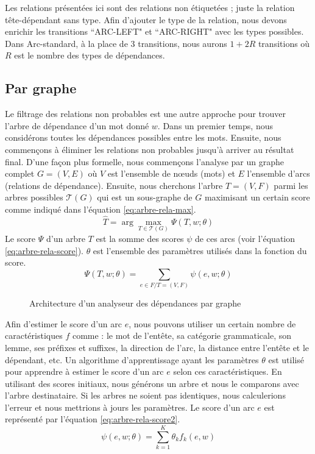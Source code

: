 \documentclass{KodeBook}
\begin{document}
Les relations présentées ici sont des relations non étiquetées ; juste la relation tête-dépendant sans type.
Afin d'ajouter le type de la relation, nous devons enrichir les transitions ``ARC-LEFT" et ``ARC-RIGHT" avec les types possibles. 
Dans Arc-standard, à la place de 3 transitions, nous aurons $1+2R$ transitions où $R$ est le nombre des types de dépendances.

\subsection{Par graphe}

Le filtrage des relations non probables est une autre approche pour trouver l'arbre de dépendance d'un mot donné $w$. 
Dans un premier temps, nous considérons toutes les dépendances possibles entre les mots. 
Ensuite, nous commençons à éliminer les relations non probables jusqu'à arriver au résultat final. 
D'une façon plus formelle, nous commençons l'analyse par un graphe complet $G = (V, E)$ où $V$ est l'ensemble de nœuds (mots) et $E$ l'ensemble d'arcs (relations de dépendance). 
Ensuite, nous cherchons l'arbre $T = (V, F)$ parmi les arbres possibles $\mathcal{T}(G)$ qui est un sous-graphe de $G$ maximisant un certain score comme indiqué dans l'équation \ref{eq:arbre-rela-max}.
\begin{equation}
\hat{T} = \arg\max\limits_{T \in \mathcal{T}(G)} \Psi(T, w; \theta)
\label{eq:arbre-rela-max}
\end{equation}
Le score $\Psi$ d'un arbre $T$ est la somme des scores $\psi$ de ces arcs (voir l'équation \ref{eq:arbre-rela-score}). 
$\theta$ est l'ensemble des paramètres utilisés dans la fonction du score.
\begin{equation}
\Psi(T, w; \theta) = \sum_{e \in F / T = (V, F)} \psi(e, w; \theta)
\label{eq:arbre-rela-score}
\end{equation}

\begin{figure}[ht]
	\centering
	\caption{Architecture d'un analyseur des dépendances par graphe \label{fig:dep-graph-arch}}
\end{figure}

Afin d'estimer le score d'un arc $e$, nous pouvons utiliser un certain nombre de caractéristiques $f$ comme : le mot de l'entête, sa catégorie grammaticale, son lemme, ses préfixes et suffixes, la direction de l'arc, la distance entre l'entête et le dépendant, etc.
Un algorithme d'apprentissage ayant les paramètres $\theta$ est utilisé pour apprendre à estimer le score d'un arc $e$ selon ces caractéristiques. 
En utilisant des scores initiaux, nous générons un arbre et nous le comparons avec l'arbre destinataire. 
Si les arbres ne soient pas identiques, nous calculerions l'erreur et nous mettrions à jours les paramètres.
Le score d'un arc $e$ est représenté par l'équation \ref{eq:arbre-rela-score2}.
\begin{equation}
\psi(e, w; \theta) = \sum_{k = 1}^{K} \theta_k f_k(e, w)
\label{eq:arbre-rela-score2}
\end{equation}
\end{document}
